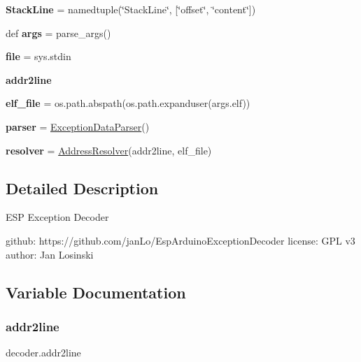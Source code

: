 \begin{DoxyCompactItemize}
{\bfseries Stack\+Line} = namedtuple(\char`\"{}Stack\+Line\char`\"{}, \mbox{[}\char`\"{}offset\char`\"{}, \char`\"{}content\char`\"{}\mbox{]})
\item 
\mbox{\label{namespacedecoder_a17b29289061f7d4f4ead11ba35a45843}} 
def {\bfseries args} = parse\+\_\+args()
\item 
\mbox{\label{namespacedecoder_a20a0ba5d4c33ecac43cc5e00ae13493b}} 
{\bfseries file} = sys.\+stdin
\item 
{\bfseries addr2line}
\item 
\mbox{\label{namespacedecoder_af40c49fe9d421f8feaf3177a6b3e9eda}} 
{\bfseries elf\+\_\+file} = os.\+path.\+abspath(os.\+path.\+expanduser(args.\+elf))
\item 
\mbox{\label{namespacedecoder_a74a58ed8ff14ea75bd62711ce9bd4934}} 
{\bfseries parser} = \mbox{\hyperlink{classdecoder_1_1_exception_data_parser}{Exception\+Data\+Parser}}()
\item 
\mbox{\label{namespacedecoder_a860678485df5be02ecdb467f64ab2db3}} 
{\bfseries resolver} = \mbox{\hyperlink{classdecoder_1_1_address_resolver}{Address\+Resolver}}(addr2line, elf\+\_\+file)
\end{DoxyCompactItemize}


\subsection{Detailed Description}
\begin{DoxyVerb}ESP Exception Decoder

github:  https://github.com/janLo/EspArduinoExceptionDecoder
license: GPL v3
author:  Jan Losinski
\end{DoxyVerb}
 

\subsection{Variable Documentation}
\mbox{\label{namespacedecoder_a33f11414906f128a4f93627a55c8983f}} 
\subsubsection{\texorpdfstring{addr2line}{addr2line}}
{\footnotesize\ttfamily decoder.\+addr2line}

